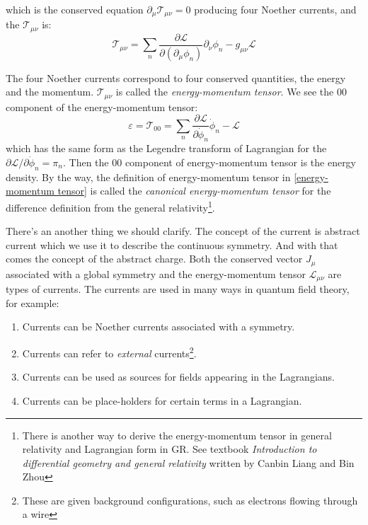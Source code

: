 \documentclass[12pt,openany]{book}
\begin{document}
	which is the conserved equation $\partial_\mu \mathcal{T}_{\mu\nu}=0 $ producing four Noether currents, and the $\mathcal{T}_{\mu\nu}$ is:
	\begin{equation}\label{energy-momentum tensor}
		\boxed{ \mathcal{T}_{\mu\nu}=\sum_n\frac{\partial\mathcal{L}}{\partial(\partial_\mu\phi_n)}\partial_\nu\phi_n-g_{\mu\nu}\mathcal{L}      }
	\end{equation}\par 
	The four Noether currents correspond to four conserved quantities, the energy and the momentum. $\mathcal{T}_{\mu\nu}$ is called the \textit{energy-momentum tensor}.
	We see the $00$ component of the energy-momentum tensor:
	\begin{equation}
		\varepsilon=\mathcal{T}_{00}=\sum_{n}\frac{\partial\mathcal{L}}{\partial\dot\phi_n}\dot\phi_n-\mathcal{L}
	\end{equation}
	which has the same form as the Legendre transform of Lagrangian for the $\partial\mathcal{L}/\partial\dot\phi_n=\pi_n$. Then the 
	$00$ component of energy-momentum tensor is the energy density. By the way, the definition of energy-momentum tensor in \eqref{energy-momentum tensor} is called the 
	\textit{canonical energy-momentum tensor} for the difference definition from the general relativity\footnote{There is another way to derive the energy-momentum tensor in general relativity and Lagrangian form in GR. See textbook \textit{Introduction to differential geometry and general relativity} written by Canbin Liang and Bin Zhou }.\par 
	There's an another thing we should clarify. The concept of the current is abstract current which we use it to describe the continuous symmetry. And with that
	comes the concept of the abstract charge. Both the conserved vector $J_\mu$ associated with a global symmetry and the energy-momentum tensor $\mathcal{L}_{\mu\nu}$ are types 
	of currents. The currents are used in many ways in quantum field theory, for example:
	\begin{enumerate}
		\item Currents can be Noether currents associated with a symmetry.\\
		\item Currents can refer to \textit{external} currents\footnote{These are given background configurations, such as electrons flowing through a wire}.\\
		\item Currents can be used as sources for fields appearing in the Lagrangians.\\
		\item Currents can be place-holders for certain terms in a Lagrangian.
	\end{enumerate}\par 
\end{document}
